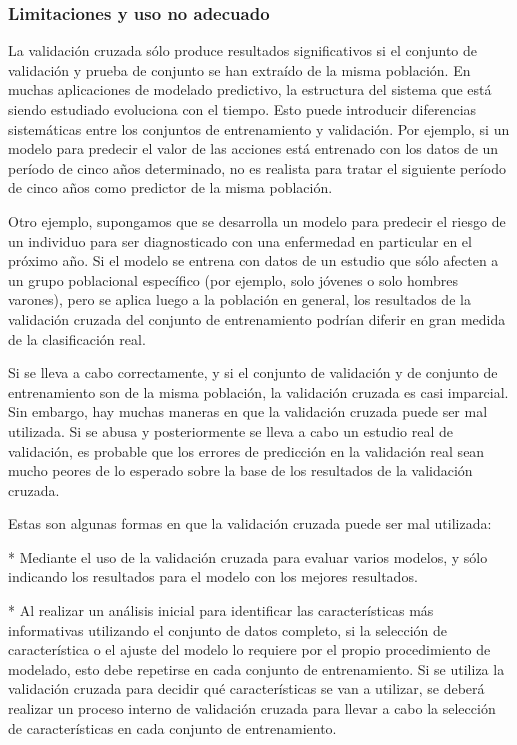 \documentclass[10pt,a4paper]{article}
\begin{document}
\subsubsection{Limitaciones y uso no adecuado}
La validación cruzada sólo produce resultados significativos si el conjunto de validación y prueba de conjunto se han extraído de la misma población. En muchas aplicaciones de modelado predictivo, la estructura del sistema que está siendo estudiado evoluciona con el tiempo. Esto puede introducir diferencias sistemáticas entre los conjuntos de entrenamiento y validación. Por ejemplo, si un modelo para predecir el valor de las acciones está entrenado con los datos de un período de cinco años determinado, no es realista para tratar el siguiente período de cinco años como predictor de la misma población.

Otro ejemplo, supongamos que se desarrolla un modelo para predecir el riesgo de un individuo para ser diagnosticado con una enfermedad en particular en el próximo año. Si el modelo se entrena con datos de un estudio que sólo afecten a un grupo poblacional específico (por ejemplo, solo jóvenes o solo hombres varones), pero se aplica luego a la población en general, los resultados de la validación cruzada del conjunto de entrenamiento podrían diferir en gran medida de la clasificación real.

Si se lleva a cabo correctamente, y si el conjunto de validación y de conjunto de entrenamiento son de la misma población, la validación cruzada es casi imparcial. Sin embargo, hay muchas maneras en que la validación cruzada puede ser mal utilizada. Si se abusa y posteriormente se lleva a cabo un estudio real de validación, es probable que los errores de predicción en la validación real sean mucho peores de lo esperado sobre la base de los resultados de la validación cruzada.

Estas son algunas formas en que la validación cruzada puede ser mal utilizada:

* Mediante el uso de la validación cruzada para evaluar varios modelos, y sólo indicando los resultados para el modelo con los mejores resultados.

* Al realizar un análisis inicial para identificar las características más informativas utilizando el conjunto de datos completo, si la selección de característica o el ajuste del modelo lo requiere por el propio procedimiento de modelado, esto debe repetirse en cada conjunto de entrenamiento. Si se utiliza la validación cruzada para decidir qué características se van a utilizar, se deberá realizar un proceso interno de validación cruzada para llevar a cabo la selección de características en cada conjunto de entrenamiento.
\end{document}

